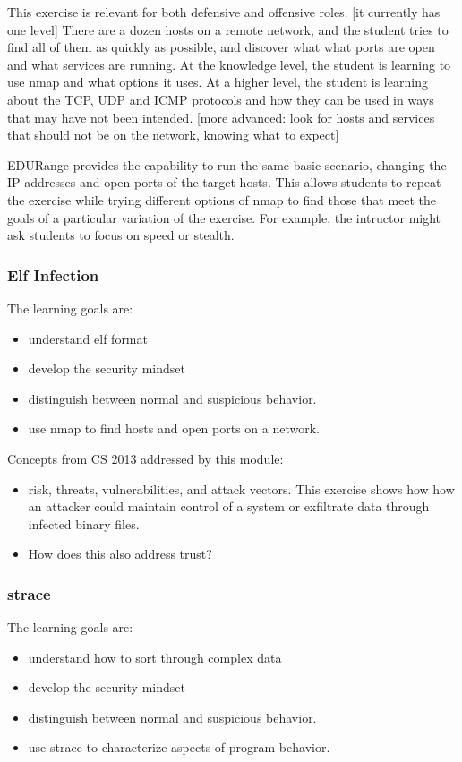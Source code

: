 This exercise is relevant for both defensive and offensive roles.  [it currently has one level]
There are a dozen hosts on a remote network, and the student tries to find all of them as quickly as 
possible, and discover what what ports are open and what services are running.  At the knowledge level,
the student is learning to use nmap and what options it uses.  At a higher level, the student is learning
about the TCP, UDP and ICMP protocols and how they can be used in ways that may have not been intended.
[more advanced: look for hosts and services that should not be on the network, knowing what to expect]

EDURange provides the capability to run the same basic scenario, changing the IP addresses and open ports
of the target hosts.  This allows students to repeat the exercise while trying different options of nmap to
find those that meet the goals of a particular variation of the exercise.  For example, the intructor
might ask students to focus on speed or stealth.

\subsubsection{Elf Infection}
The learning goals are:
\begin{itemize}
\item understand elf format
\item develop the security mindset
\item distinguish between normal and suspicious behavior.
\item use nmap to find hosts and open ports on a network.
\end{itemize}
Concepts from CS 2013 addressed by this module:
\begin{itemize}
\item  risk, threats, vulnerabilities, and attack vectors.  This exercise shows how how an attacker
  could maintain control of a system or exfiltrate data through infected binary files.
\item How does this also address trust?
\end{itemize}

\subsubsection{strace}
The learning goals are:
\begin{itemize}
\item understand how to sort through complex data
\item develop the security mindset
\item distinguish between normal and suspicious behavior.
\item use strace to characterize aspects of program behavior.
\end{itemize}


